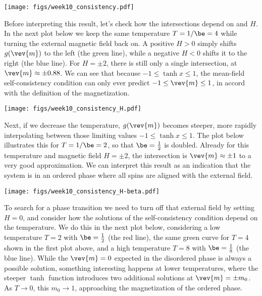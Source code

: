 \begin{center}\texttt{[image: figs/week10\_consistency.pdf]}\end{center}

Before interpreting this result, let's check how the intersections depend on \be and $H$.
In the next plot below we keep the same temperature $T = 1 / \be = 4$ while turning the external magnetic field back on.
A positive $H > 0$ simply shifts $g(\vev{m})$ to the left (the green line), while a negative $H < 0$ shifts it to the right (the blue line).
For $H = \pm 2$, there is still only a single intersection, at $\vev{m} \approx \pm 0.88$.
We can see that because $-1 \leq \tanh x \leq 1$, the mean-field self-consistency condition can only ever predict $-1 \leq \vev{m} \leq 1$, in accord with the definition of the magnetization.

\begin{center}\texttt{[image: figs/week10\_consistency\_H.pdf]}\end{center}

Next, if we decrease the temperature, $g(\vev{m})$ becomes steeper, more rapidly interpolating between those limiting values $-1 \leq \tanh x \leq 1$.
The plot below illustrates this for $T = 1 / \be = 2$, so that $\be = \frac{1}{2}$ is doubled.
Already for this temperature and magnetic field $H = \pm 2$, the intersection is $\vev{m} \approx \pm 1$ to a very good approximation.
We can interpret this result as an indication that the system is in an ordered phase where all spins are aligned with the external field.

\begin{center}\texttt{[image: figs/week10\_consistency\_H-beta.pdf]}\end{center}

To search for a phase transition we need to turn off that external field by setting $H = 0$, and consider how the solutions of the self-consistency condition depend on the temperature.
We do this in the next plot below, considering a low temperature $T = 2$ with $\be = \frac{1}{2}$ (the red line), the same green curve for $T = 4$ shown in the first plot above, and a high temperature $T = 8$ with $\be = \frac{1}{8}$ (the blue line).
While the $\vev{m} = 0$ expected in the disordered phase is always a possible solution, something interesting happens at lower temperatures, where the steeper $\tanh$ function introduces two additional solutions at $\vev{m} = \pm m_0$.
As $T \to 0$, this $m_0 \to 1$, approaching the magnetization of the ordered phase.

